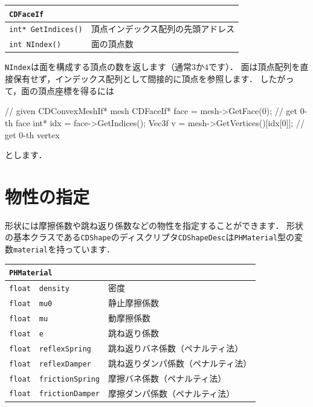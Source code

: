 \begin{center}
\begin{tabular}{lll}
\multicolumn{3}{l}{\texttt{CDFaceIf}}						\\ \midrule
\multicolumn{2}{l}{\texttt{int* GetIndices()}}				& \KLUDGE 頂点インデックス配列の先頭アドレス	\\
\multicolumn{2}{l}{\texttt{int NIndex()}}					& \KLUDGE 面の頂点数							\\
\end{tabular}
\end{center}

\texttt{NIndex}\KLUDGE は面を構成する頂点の数を返します（通常$3$\KLUDGE か$4$\KLUDGE です）．
\KLUDGE 面は頂点配列を直接保有せず，インデックス配列として間接的に頂点を参照します．
\KLUDGE したがって，面の頂点座標を得るには
\begin{sourcecode}
// given CDConvexMeshIf* mesh
CDFaceIf* face = mesh->GetFace(0);        // get 0-th face
int* idx = face->GetIndices();
Vec3f v = mesh->GetVertices()[idx[0]];    // get 0-th vertex
\end{sourcecode}
\KLUDGE とします．

\section{\KLUDGE 物性の指定}
\label{sec_collision_material}

\KLUDGE 形状には摩擦係数や跳ね返り係数などの物性を指定することができます．
\KLUDGE 形状の基本クラスである\texttt{CDShape}\KLUDGE のディスクリプタ\texttt{CDShapeDesc}\KLUDGE は\texttt{PHMaterial}\KLUDGE 型の変数\texttt{material}\KLUDGE を持っています．

\begin{center}
\begin{tabular}{lll}
\multicolumn{3}{l}{\texttt{PHMaterial}}							\\ \midrule
\texttt{float}	&	\texttt{density}		& \KLUDGE 密度				\\
\texttt{float}	&	\texttt{mu0}			& \KLUDGE 静止摩擦係数		\\
\texttt{float}	&	\texttt{mu}				& \KLUDGE 動摩擦係数		\\
\texttt{float}	&	\texttt{e}				& \KLUDGE 跳ね返り係数		\\
\texttt{float}	&	\texttt{reflexSpring}	& \KLUDGE 跳ね返りバネ係数（ペナルティ法）	\\
\texttt{float}	&	\texttt{reflexDamper}	& \KLUDGE 跳ね返りダンパ係数（ペナルティ法）\\
\texttt{float}	&	\texttt{frictionSpring}	& \KLUDGE 摩擦バネ係数（ペナルティ法）	\\
\texttt{float}	&	\texttt{frictionDamper}	& \KLUDGE 摩擦ダンパ係数（ペナルティ法）\\
\end{tabular}
\end{center}


